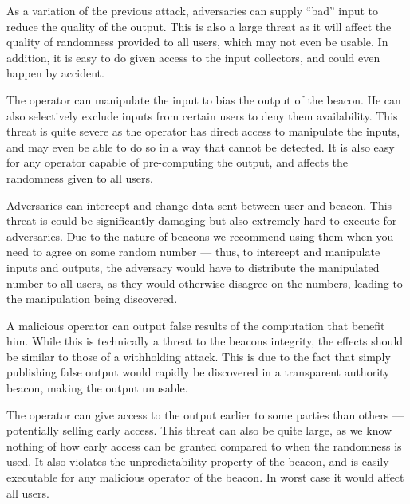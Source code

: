 As a variation of the previous attack, adversaries can supply \enquote{bad} input to reduce the quality of the output.
This is also a large threat as it will affect the quality of randomness provided to all users, which may not even be usable.
In addition, it is easy to do given access to the input collectors, and could even happen by accident.

The operator can manipulate the input to bias the output of the beacon.
He can also selectively exclude inputs from certain users to deny them availability.
This threat is quite severe as the operator has direct access to manipulate the inputs, and may even be able to do so in a way that cannot be detected.
It is also easy for any operator capable of pre-computing the output, and affects the randomness given to all users.

Adversaries can intercept and change data sent between user and beacon.
This threat is could be significantly damaging but also extremely hard to execute for adversaries.
Due to the nature of beacons we recommend using them when you need to agree on some random number --- thus, to intercept and manipulate inputs and outputs, the adversary would have to distribute the manipulated number to all users, as they would otherwise disagree on the numbers, leading to the manipulation being discovered.

A malicious operator can output false results of the computation that benefit him.
While this is technically a threat to the beacons integrity, the effects should be similar to those of a withholding attack.
This is due to the fact that simply publishing false output would rapidly be discovered in a transparent authority beacon, making the output unusable.

The operator can give access to the output earlier to some parties than others --- potentially selling early access.
This threat can also be quite large, as we know nothing of how early access can be granted compared to when the randomness is used.
It also violates the unpredictability property of the beacon, and is easily executable for any malicious operator of the beacon.
In worst case it would affect all users.

